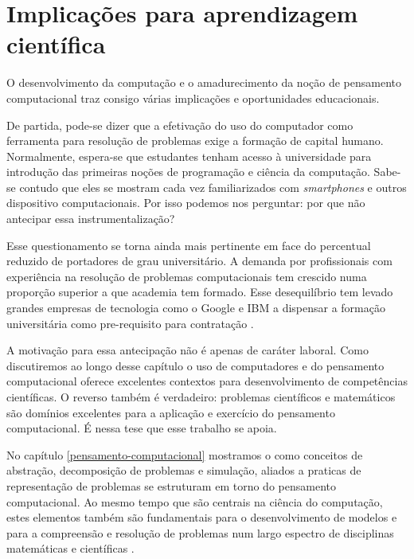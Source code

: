 \chapter{Implicações para aprendizagem científica}

O desenvolvimento da computação e o amadurecimento da noção de pensamento computacional traz consigo várias implicações e oportunidades educacionais.

De partida, pode-se dizer que a efetivação do uso do computador como ferramenta para resolução de problemas exige a formação de capital humano. Normalmente, espera-se que estudantes tenham acesso à universidade para introdução das primeiras noções de programação e ciência da computação. Sabe-se contudo que eles se mostram cada vez familiarizados com \textit{smartphones} e outros dispositivo computacionais. Por isso podemos nos perguntar: por que não antecipar essa instrumentalização? 

Esse questionamento se torna ainda mais pertinente em face do percentual reduzido de portadores de grau universitário. A demanda por profissionais com experiência na resolução de problemas computacionais tem crescido numa proporção superior a que academia tem formado. Esse desequilíbrio tem levado grandes empresas de tecnologia como o Google e IBM a dispensar a formação universitária como pre-requisito para contratação \cite{Purtill}.

A motivação para essa antecipação não é apenas de caráter laboral. Como discutiremos ao longo desse capítulo o uso de computadores e do pensamento computacional oferece excelentes contextos para desenvolvimento de competências científicas. O reverso também é verdadeiro: problemas científicos e matemáticos são domínios excelentes para a aplicação e exercício do pensamento computacional. É nessa tese que esse trabalho se apoia. 

No capítulo \ref{pensamento-computacional} mostramos o como conceitos de abstração, decomposição de problemas e simulação, aliados a praticas de representação de problemas se estruturam em torno do pensamento computacional. Ao mesmo tempo que são centrais na ciência do computação, estes elementos também são fundamentais para o desenvolvimento de modelos e para a compreensão e resolução de problemas num largo espectro de disciplinas matemáticas e científicas \cite{Sengupta2013}.


